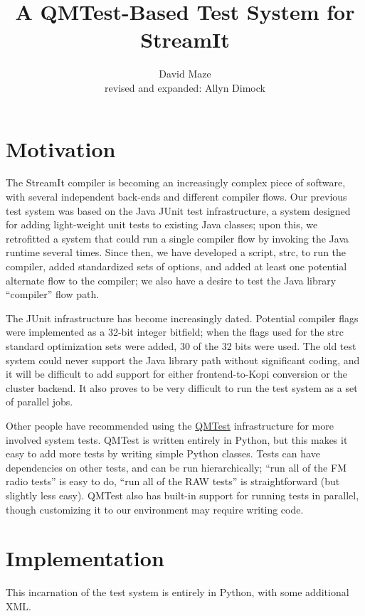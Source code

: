 \documentclass[11pt]{article}
\title{A QMTest-Based Test System for StreamIt}
\author{David Maze\\revised and expanded: Allyn Dimock}
\begin{document}
\maketitle
\tableofcontents

\section{Motivation}

The StreamIt compiler is becoming an increasingly complex piece of
software, with several independent back-ends and different compiler
flows.  Our previous test system was based on the Java JUnit test
infrastructure, a system designed for adding light-weight unit tests
to existing Java classes; upon this, we retrofitted a system that
could run a single compiler flow by invoking the Java runtime several
times.  Since then, we have developed a script, \textsf{strc}, to run
the compiler, added standardized sets of options, and added at least
one potential alternate flow to the compiler; we also have a desire to
test the Java library ``compiler'' flow path.

The JUnit infrastructure has become increasingly dated.  Potential
compiler flags were implemented as a 32-bit integer bitfield; when the
flags used for the \textsf{strc} standard optimization sets were
added, 30 of the 32 bits were used.  The old test system could never
support the Java library path without significant coding, and it will
be difficult to add support for either frontend-to-Kopi conversion or
the cluster backend.  It also proves to be very difficult to run the
test system as a set of parallel jobs.

Other people have recommended using the
\href{http://www.qmtest.com/}{QMTest} infrastructure for more involved
system tests.  QMTest is written entirely in Python, but this makes it
easy to add more tests by writing simple Python classes.  Tests can
have dependencies on other tests, and can be run hierarchically; ``run
all of the FM radio tests'' is easy to do, ``run all of the RAW
tests'' is straightforward (but slightly less easy).  QMTest also has
built-in support for running tests in parallel, though customizing it
to our environment may require writing code.

\section{Implementation}

This incarnation of the test system is entirely in Python, with some
additional XML.
\end{document}
